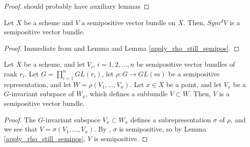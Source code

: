 \begin{proof}
should probably have auxiliary lemmas
\end{proof}

\begin{lemma}
Let $X$ be a scheme and $V$ a semipositive vector bundle on $X$. Then, $Sym^dV$ is a semipositive vector bundle.
\end{lemma}

\begin{proof}
Immediate from and Lemma  and Lemma \ref{apply_rho_still_semipos}.
\end{proof}

\begin{lemma}
Let $X$ be a scheme, and let $V_i$, $i=1,2,\ldots,n$ be semipositive vector bundles of rank $r_i$. Let $G=\prod_{i=1}^{n}GL(r_i)$, let $\rho:G\to GL(m)$ be a semipositive representation, and let $W=\rho(V_1,\ldots,V_n)$. Let $x\in X$ be a point, and let $V_x$ be a $G$-invariant subspace of $W_x$, which defines a subbundle $V\subset W$. Then, $V$ is a semipositive vector bundle.
\end{lemma}

\begin{proof}
The $G$-invariant subspace $V_x\subset W_x$ defines a subrepresentation $\sigma$ of $\rho$, and we see that $V=\sigma(V_1,\ldots,V_n)$. By , $\sigma$ is semipositive, so by Lemma \ref{apply_rho_still_semipos}, $V$ is semipositive.
\end{proof}







